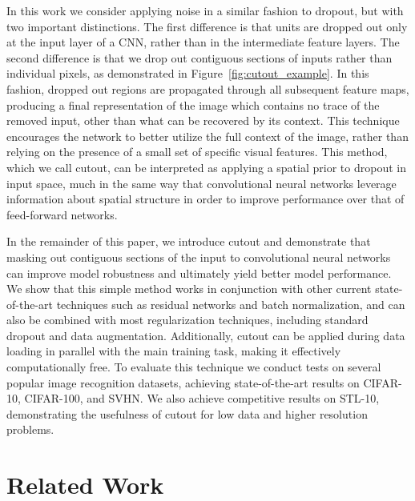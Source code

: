 \documentclass[10pt,twocolumn,letterpaper]{article}
\begin{document}
In this work we consider applying noise in a similar fashion to dropout, but with two important distinctions. The first difference is that units are dropped out only at the input layer of a CNN, rather than in the intermediate feature layers. The second difference is that we drop out contiguous sections of inputs rather than individual pixels, as demonstrated in Figure~\ref{fig:cutout_example}. In this fashion, dropped out regions are propagated through all subsequent feature maps, producing a final representation of the image which contains no trace of the removed input, other than what can be recovered by its context. This technique encourages the network to better utilize the full context of the image, rather than relying on the presence of a small set of specific visual features. This method, which we call cutout, can be interpreted as applying a spatial prior to dropout in input space, much in the same way that convolutional neural networks leverage information about spatial structure in order to improve performance over that of feed-forward networks.


In the remainder of this paper, we introduce cutout and demonstrate that masking out contiguous sections of the input to convolutional neural networks can improve model robustness and ultimately yield better model performance. We show that this simple method works in conjunction with other current state-of-the-art techniques such as residual networks and batch normalization, and can also be combined with most regularization techniques, including standard dropout and data augmentation. Additionally, cutout can be applied during data loading in parallel with the main training task, making it effectively computationally free. To evaluate this technique we conduct tests on several popular image recognition datasets, achieving state-of-the-art results on CIFAR-10, CIFAR-100, and SVHN\@. We also achieve competitive results on  STL-10, demonstrating the usefulness of cutout for low data and higher resolution problems.

\section{Related Work}
\end{document}
